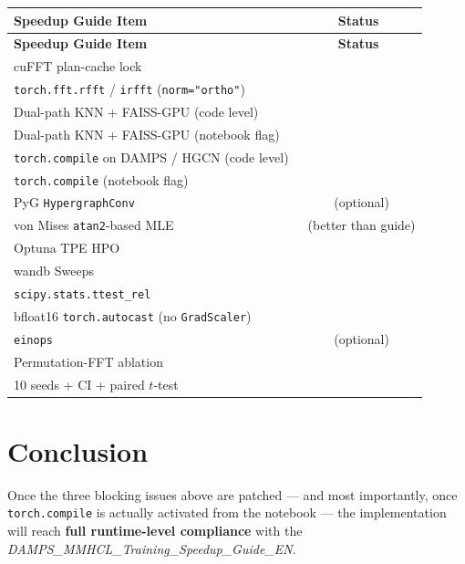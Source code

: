 \documentclass[11pt,a4paper]{article}
\newcommand{\cmark}{\textcolor{okgreen}{\ding{51}}}
\newcommand{\xmark}{\textcolor{warnorange}{\ding{55}}}
\newcommand{\warn}{\textcolor{warnorange}{\ding{115}}}
\begin{document}
\begin{longtable}{|p{8.4cm}|c|}
\hline
\textbf{Speedup Guide Item} & \textbf{Status}\\
\hline
\endhead
\hline
\textbf{Speedup Guide Item} & \textbf{Status}\\
\hline
\endfoot
\hline
\endlastfoot
cuFFT plan-cache lock                                      & \cmark \\
\hline
\texttt{torch.fft.rfft} / \texttt{irfft} (\texttt{norm="ortho"}) & \cmark \\
\hline
Dual-path KNN + FAISS-GPU (code level)                     & \cmark \\
\hline
Dual-path KNN + FAISS-GPU (notebook flag)                  & \warn \\
\hline
\texttt{torch.compile} on DAMPS / HGCN (code level)        & \cmark \\
\hline
\texttt{torch.compile} (notebook flag)                     & \warn \\
\hline
PyG \texttt{HypergraphConv}                                & \xmark\ (optional) \\
\hline
von Mises \texttt{atan2}-based MLE                         & \cmark\ (better than guide) \\
\hline
Optuna TPE HPO                                             & \cmark \\
\hline
wandb Sweeps                                               & \cmark \\
\hline
\texttt{scipy.stats.ttest\_rel}                            & \cmark \\
\hline
bfloat16 \texttt{torch.autocast} (no \texttt{GradScaler})  & \cmark \\
\hline
\texttt{einops}                                            & \xmark\ (optional) \\
\hline
Permutation-FFT ablation                                   & \cmark \\
\hline
10 seeds + CI + paired $t$-test                            & \warn \\
\hline
\end{longtable}

\section{Conclusion}
Once the three blocking issues above are patched --- and most importantly,
once \texttt{torch.compile} is actually activated from the notebook --- the
implementation will reach \textbf{full runtime-level compliance} with the
\textit{DAMPS\_MMHCL\_Training\_Speedup\_Guide\_EN}.
\end{document}
